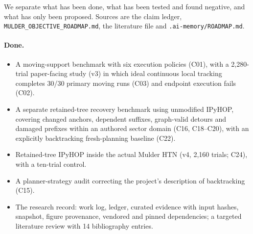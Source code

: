 We separate what has been done, what has been tested and found negative, and what has only been proposed.
Sources are the claim ledger, \texttt{MULDER\_\allowbreak{}OBJECTIVE\_\allowbreak{}ROADMAP.md}, the literature file and
\texttt{.ai-memory/\allowbreak{}ROADMAP.md}.

\paragraph{Done.}
\begin{itemize}
  \item A moving-support benchmark with six execution policies (C01), with a 2,280-trial paper-facing study (v3)
    in which ideal continuous local tracking completes 30/30 primary moving runs (C03) and endpoint execution
    fails (C02).
  \item A separate retained-tree recovery benchmark using unmodified IPyHOP, covering changed anchors,
    dependent suffixes, graph-valid detours and damaged prefixes within an authored sector domain (C16, C18--C20),
    with an explicitly backtracking fresh-planning baseline (C22).
  \item Retained-tree IPyHOP inside the actual Mulder HTN (v4, 2,160 trials; C24), with a ten-trial control.
  \item A planner-strategy audit correcting the project's description of backtracking (C15).
  \item The research record: work log, ledger, curated evidence with input hashes, snapshot, figure provenance,
    vendored and pinned dependencies; a targeted literature review with 14 bibliography entries.
\end{itemize}

